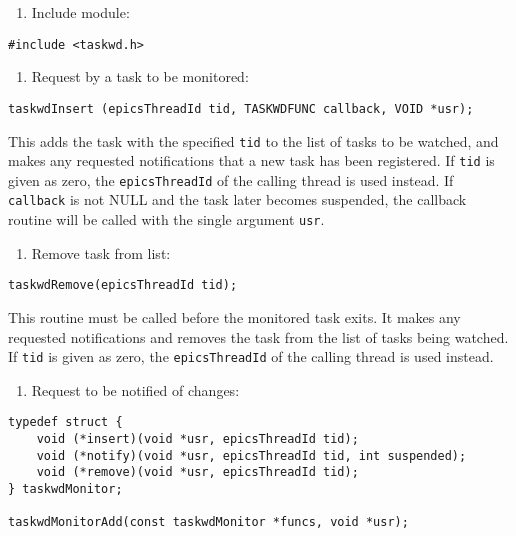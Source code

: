 \begin{enumerate}\item Include module:

\end{enumerate}\begin{verbatim}
#include <taskwd.h>

\end{verbatim}\begin{enumerate}\item Request by a task to be monitored:

\end{enumerate}\begin{verbatim}
taskwdInsert (epicsThreadId tid, TASKWDFUNC callback, VOID *usr);

\end{verbatim}\begin{description}\item This adds the task with the specified \verb|tid| to the list of tasks to be watched, and makes any requested notifications 
that a new task has been registered. If \verb|tid| is given as zero, the \verb|epicsThreadId| of the calling thread is used 
instead. If \verb|callback| is not NULL and the task later becomes suspended, the callback routine will be called with 
the single argument \verb|usr|.

\item 

\end{description}\begin{enumerate}\item Remove task from list:

\end{enumerate}\begin{verbatim}
taskwdRemove(epicsThreadId tid);

\end{verbatim}\begin{description}\item This routine must be called before the monitored task exits. It makes any requested notifications and removes the 
task from the list of tasks being watched. If \verb|tid| is given as zero, the \verb|epicsThreadId| of the calling thread is 
used instead.

\end{description}\begin{enumerate}\item Request to be notified of changes:

\end{enumerate}\begin{verbatim}
typedef struct {
    void (*insert)(void *usr, epicsThreadId tid);
    void (*notify)(void *usr, epicsThreadId tid, int suspended);
    void (*remove)(void *usr, epicsThreadId tid);
} taskwdMonitor;

taskwdMonitorAdd(const taskwdMonitor *funcs, void *usr);

\end{verbatim}
